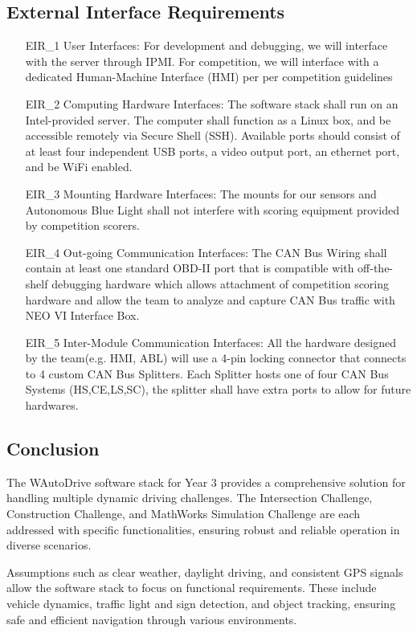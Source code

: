 \documentclass[12pt]{article}
\begin{document}
\subsection{External Interface Requirements}
\begin{itemize}
    \item[EIR\_1] User Interfaces: For development and debugging, we will interface with the server through IPMI. For competition, we will interface with a dedicated Human-Machine Interface (HMI) per per competition guidelines
    \item[EIR\_2] Computing Hardware Interfaces: The software stack shall run on an Intel-provided server. The computer shall function as a Linux box, and be accessible remotely via Secure Shell (SSH). Available ports should consist of at least four independent USB ports, a video output port, an ethernet port, and be WiFi enabled.
    \item[EIR\_3] Mounting Hardware Interfaces: The mounts for our sensors and Autonomous Blue Light shall not interfere with scoring equipment provided by competition scorers.
    \item[EIR\_4] Out-going Communication Interfaces: The CAN Bus Wiring shall contain at least one standard OBD-II port that is compatible with off-the-shelf debugging hardware which allows attachment of competition scoring hardware and allow the team to analyze and capture CAN Bus traffic with NEO VI Interface Box.
    \item[EIR\_5] Inter-Module Communication Interfaces: All the hardware designed by the team(e.g. HMI, ABL) will use a 4-pin locking connector that connects to 4 custom CAN Bus Splitters. Each Splitter hosts one of four CAN Bus Systems (HS,CE,LS,SC), the splitter shall have extra ports to allow for future hardwares.
    \end{itemize}


\subsection{Conclusion}
The WAutoDrive software stack for Year 3 provides a comprehensive solution for handling multiple dynamic driving challenges. The Intersection Challenge, Construction Challenge, and MathWorks Simulation Challenge are each addressed with specific functionalities, ensuring robust and reliable operation in diverse scenarios.

Assumptions such as clear weather, daylight driving, and consistent GPS signals allow the software stack to focus on functional requirements. These include vehicle dynamics, traffic light and sign detection, and object tracking, ensuring safe and efficient navigation through various environments.
\end{document}
